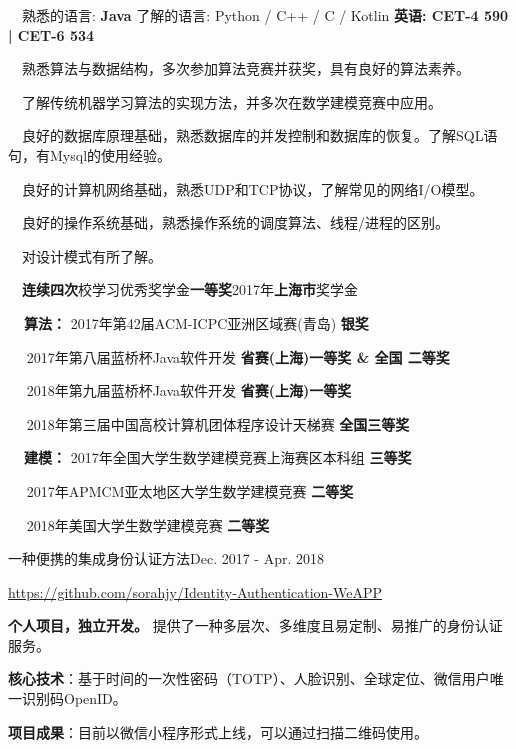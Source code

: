 \documentclass{sorahjy_cv}
\begin{document}
\begin{description}{}
	\item{\ \ 熟悉的语言: } \textbf{Java} \quad 了解的语言: Python / C++ / C / Kotlin \quad \textbf{英语: CET-4 590 | CET-6 534}
	\item{\ \ }熟悉算法与数据结构，多次参加算法竞赛并获奖，具有良好的算法素养。
	\item{\ \ }了解传统机器学习算法的实现方法，并多次在数学建模竞赛中应用。
	\item{\ \ }良好的数据库原理基础，熟悉数据库的并发控制和数据库的恢复。了解SQL语句，有Mysql的使用经验。
	\item{\ \ }良好的计算机网络基础，熟悉UDP和TCP协议，了解常见的网络I/O模型。
	\item{\ \ }良好的操作系统基础，熟悉操作系统的调度算法、线程/进程的区别。
	\item{\ \ }对设计模式有所了解。
\end{description}

%
%

\begin{description}{}
	\item{\ \ }\textbf{连续四次}校学习优秀奖学金\textbf{一等奖}\quad \quad 2017年\textbf{上海市}奖学金
	\item{\textbf{\ \ 算法：}} 2017年第42届ACM-ICPC亚洲区域赛(青岛) \hfill \textbf{银奖}
	\item{\ \ \quad \quad \quad } 2017年第八届蓝桥杯Java软件开发 \hfill \textbf{省赛(上海)一等奖 \& 全国 二等奖}
	\item{\ \ \quad \quad \quad } 2018年第九届蓝桥杯Java软件开发 \hfill \textbf{省赛(上海)一等奖}
	\item{\ \ \quad \quad \quad } 2018年第三届中国高校计算机团体程序设计天梯赛 \hfill \textbf{全国三等奖}
	\item{\textbf{\ \ 建模：}} 2017年全国大学生数学建模竞赛上海赛区本科组 \hfill \textbf{三等奖}
	\item{\ \ \quad \quad \quad } 2017年APMCM亚太地区大学生数学建模竞赛 \hfill \textbf{二等奖}
	\item{\ \ \quad \quad \quad } 2018年美国大学生数学建模竞赛 \hfill \textbf{二等奖}
\end{description}


%
%


\begin{sectionContentSimple}{一种便携的集成身份认证方法}{Dec. 2017 - Apr. 2018}
	\item \url{https://github.com/sorahjy/Identity-Authentication-WeAPP}
	\item \textbf{个人项目，独立开发。} 提供了一种多层次、多维度且易定制、易推广的身份认证服务。
	\item \textbf{核心技术}：基于时间的一次性密码（TOTP）、人脸识别、全球定位、微信用户唯一识别码OpenID。
	\item \textbf{项目成果}：目前以微信小程序形式上线，可以通过扫描二维码使用。
\end{sectionContentSimple}
\end{document}
